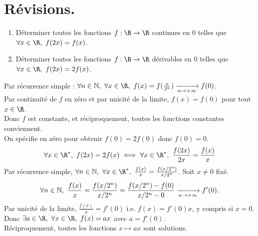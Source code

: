 \documentclass[11pt]{article}
\begin{document}


\section{Révisions.}

\begin{exercice}{}{}
    \begin{enumerate}
        \item Déterminer toutes les fonctions $f:\R\to\R$ continues en 0 telles que $\forall x \in \R, ~ f(2x)=f(x)$.
        \item Déterminer toutes les fonctions $f:\R\to\R$ dérivables en 0 telles que $\forall x \in \R, ~ f(2x)=2f(x)$. 
    \end{enumerate}
    \tcblower
     Par récurrence simple : $\forall n \in \N, ~ \forall x \in \R, ~ f(x)=f(\frac{x}{2^n}) \xrightarrow[n\to+\infty]{} f(0)$.\\
    Par continuité de $f$ en zéro et par unicité de la limite, $f(x)=f(0)$ pour tout $x\in\R$.\\
    Donc $f$ est constante, et réciproquement, toutes les fonctions constantes conviennent.\\
     On spécifie en zéro pour obtenir $f(0)=2f(0)$ donc $f(0)=0$.
    \begin{equation*}
        \forall x \in \R^*, ~ f(2x)=2f(x) \iff \forall x \in \R^*, ~ \frac{f(2x)}{2x} = \frac{f(x)}{x}
    \end{equation*}
    Par récurrence simple, $\forall n \in \N, ~ \forall x \in \R^*, ~ \frac{f(x)}{x}=\frac{f(x/2^n)}{x/2^n}$. Soit $x\neq0$ fixé.
    \begin{equation*}
        \forall n \in \mathbb{N}, ~ \frac{f(x)}{x} = \frac{f(x/2^n)}{x/2^n} = \frac{f(x/2^n)-f(0)}{x/2^n-0}\xrightarrow[n\to+\infty]{}f'(0).
    \end{equation*}
    Par unicité de la limite, $\frac{f(x)}{x}=f'(0)$ i.e. $f(x)=f'(0)x$, y compris si $x=0$.\\
    Donc $\exists a \in \R, ~ \forall x \in \R, ~ f(x)=ax$ avec $a=f'(0)$.\\
    Réciproquement, toutes les fonctions $x\mapsto ax$ sont solutions.
\end{exercice}
\end{document}
